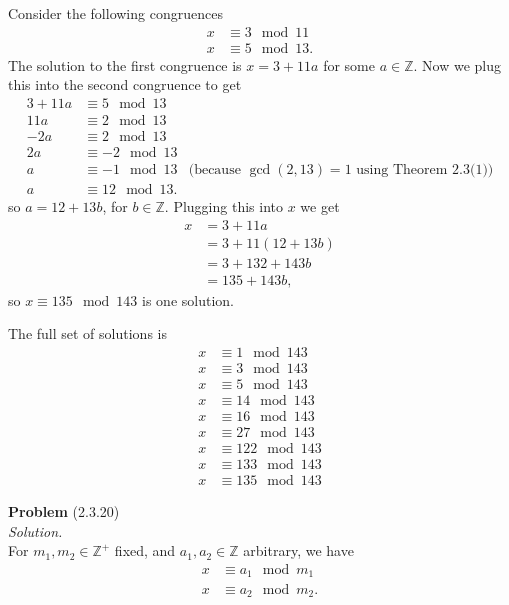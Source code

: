 \documentclass[12 pt]{amsart}
\begin{document}
  Consider the following congruences
  \begin{align*}
    x &\equiv 3 \mod 11 \\
    x &\equiv 5 \mod 13.
  \end{align*}
  The solution to the first congruence is 
  $x = 3 + 11a$ for some $a \in \mathbb{Z}$.
  Now we plug this into the second congruence
  to get
  \begin{align*}
    3 + 11a &\equiv 5 \mod 13 \\
    11a &\equiv 2 \mod 13 \\
    -2a &\equiv 2 \mod 13 \\
    2a &\equiv -2 \mod 13 \\
    a &\equiv -1 \mod 13 & \text{(because $\gcd(2,13) = 1$ using Theorem 2.3(1))} \\ 
    a &\equiv 12 \mod 13.
  \end{align*}
  so $a = 12 + 13b$, for $b \in \mathbb{Z}$.
  Plugging this into $x$ we get
  \begin{align*}
    x &= 3 + 11a \\
      &= 3 + 11(12 + 13b) \\
      &= 3 + 132 + 143b \\
      &= 135 + 143b,
  \end{align*}
  so $x \equiv 135 \mod 143$ is one solution.

  The full set of solutions is
  \begin{align*}
    x &\equiv 1 \mod 143 \\
    x &\equiv 3 \mod 143 \\
    x &\equiv 5 \mod 143 \\
    x &\equiv 14 \mod 143 \\
    x &\equiv 16 \mod 143 \\
    x &\equiv 27 \mod 143 \\
    x &\equiv 122 \mod 143 \\
    x &\equiv 133 \mod 143 \\
    x &\equiv 135 \mod 143
  \end{align*}

\vfill
\newpage



\phantom{\quad} \vfill
\noindent
\textbf{Problem} (2.3.20) \\[4ex]
\emph{Solution.} \\[2ex]
  For $m_1, m_2 \in \mathbb{Z}^+$ fixed, and 
  $a_1, a_2 \in \mathbb{Z}$ arbitrary, we have
  \begin{align*}
    x &\equiv a_1 \mod m_1 \\
    x &\equiv a_2 \mod m_2.
  \end{align*}
\end{document}
